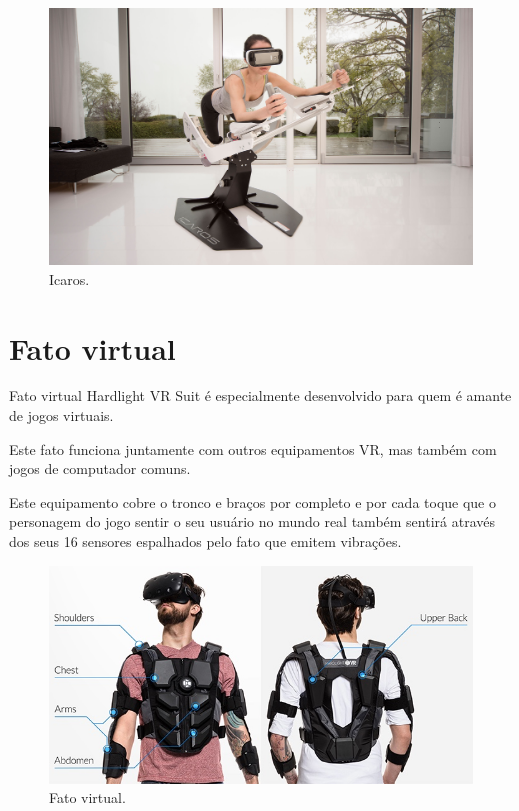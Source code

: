\begin{figure}[h]
\center
\includegraphics[scale=0.6]{imagens/RV_icaros.jpg}
\caption{Icaros. \cite{RV_icaros}}
\end{figure}


\section{Fato virtual}

Fato virtual Hardlight VR Suit é especialmente desenvolvido para quem é amante de jogos virtuais.

Este fato funciona juntamente com outros equipamentos VR, mas também com jogos de computador comuns.

Este equipamento cobre o tronco e braços por completo e por cada toque que o personagem do jogo sentir o seu usuário no mundo real também sentirá através dos seus 16 sensores espalhados pelo fato que emitem vibrações.


\begin{figure}[H]
\center
\includegraphics[scale=0.5]{imagens/RV_fato.jpg}
\caption{Fato virtual. \cite{RV_fato}}
\end{figure}



